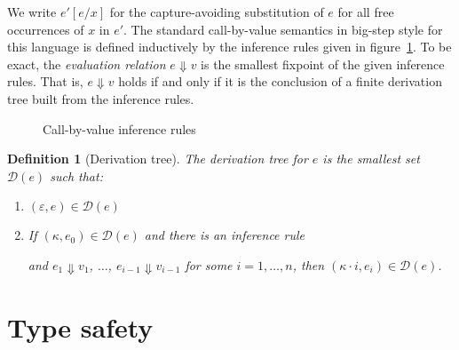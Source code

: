 \documentclass[12pt,a2paper,draft]{article}
\newcommand{\abstr}[2]{\ensuremath{\lambda{#1}.\,{#2}}}
\newcommand{\app}[2]{\ensuremath{{#1}\,{#2}}}
\newcommand{\rec}[2]{\ensuremath{{\normalfont\textsf{rec}}\,{#1}.\,{#2}}}
\newcommand{\tree}[1]{\mathcal{D}(#1)}
\newtheorem{definition}{Definition}
\begin{document}
We write $e'[e/x]$ for the capture-avoiding substitution of $e$ for all free occurrences
of $x$ in $e'$. The standard call-by-value semantics in big-step style for this language is
defined inductively by the inference rules given in figure~\ref{figure:Call_by_value_inference_rules}.
To be exact, the \emph{evaluation relation} $e \Downarrow v$ is the smallest fixpoint of
the given inference rules. That is, $e \Downarrow v$ holds if and only if it is the conclusion
of a finite derivation tree built from the inference rules.

\begin{figure}[htb]
  \centering
  \caption{Call-by-value inference rules}
  \label{figure:Call_by_value_inference_rules}
\end{figure}

\begin{definition}[Derivation tree] \label{definition:Derivation_tree}
  The \emph{derivation tree} for $e$ is the smallest set $\tree{e}$ such that:
  \begin{enumerate}
  \item $(\varepsilon, e) \in \tree{e}$
  \item If $(\kappa,e_0) \in \tree{e}$ and there is an inference rule
    \begin{mathpar}
    \end{mathpar}
    and $e_1 \Downarrow v_1$, $\ldots$, $e_{i-1} \Downarrow v_{i-1}$ for some $i = 1,\ldots,n$, then
    $(\kappa \cdot i,e_i) \in \tree{e}$.
  \end{enumerate}
\end{definition}


\section{Type safety}
\end{document}
